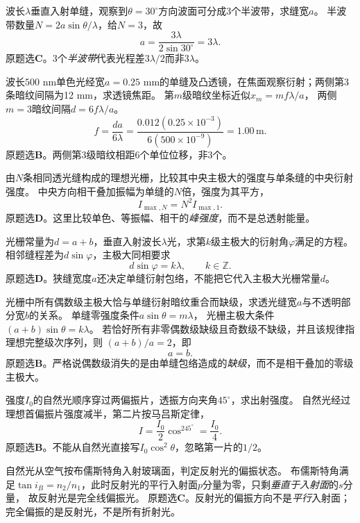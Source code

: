\problemtext 波长$\lambda$垂直入射单缝，观察到$\theta=30^\circ$方向波面可分成3个半波带，求缝宽$a$。
\workings
半波带数量$N=2a\sin\theta/\lambda$，给$N=3$，故
\[
\boxed{a=\frac{3\lambda}{2\sin30^\circ}=3\lambda}.
\]
原题选\textbf{C}。\crosscheck 3个\emph{半波带}代表光程差$3\lambda/2$而非$3\lambda$。

\problemtext 波长$500$ nm单色光经宽$a=0.25$ mm的单缝及凸透镜，在焦面观察衍射；两侧第3条暗纹间隔为12 mm，求透镜焦距。
\workings
第$m$级暗纹坐标近似$x_m=mf\lambda/a$，
两侧$m=3$暗纹间隔$d=6f\lambda/a$。
\[
\boxed{f=\frac{da}{6\lambda}
=\frac{0.012(0.25\times10^{-3})}{6(500\times10^{-9})}
=1.00\,\mathrm m}.
\]
原题选\textbf{B}。\crosscheck 两侧第3级暗纹相距$6$个单位位移，非$3$个。

\problemtext 由$N$条相同透光缝构成的理想光栅，比较其中央主极大的强度与单条缝的中央衍射强度。
\workings
中央方向相干叠加振幅为单缝的$N$倍，强度为其平方，
\[
\boxed{I_{\max,N}=N^2I_{\max,1}}.
\]
原题选\textbf{D}。\crosscheck 这里比较单色、等振幅、相干的\emph{峰强度}，而不是总透射能量。

\problemtext 光栅常量为$d=a+b$，垂直入射波长$\lambda$光，求第$k$级主极大的衍射角$\varphi$满足的方程。
\workings
相邻缝程差为$d\sin\varphi$，主极大同相要求
\[
\boxed{d\sin\varphi=k\lambda},\qquad k\in\mathbb Z.
\]
原题选\textbf{D}。\crosscheck 狭缝宽度$a$还决定单缝衍射包络，不能把它代入主极大光栅常量$d$。

\problemtext 光栅中所有偶数级主极大恰与单缝衍射暗纹重合而缺级，求透光缝宽$a$与不透明部分宽$b$的关系。
\workings
单缝零强度条件$a\sin\theta=m\lambda$，
光栅主极大条件$(a+b)\sin\theta=k\lambda$。
若恰好所有非零偶数级缺级且奇数级不缺级，并且该规律指理想完整级次序列，则
$(a+b)/a=2$，即
\[
\boxed{a=b}.
\]
原题选\textbf{B}。\crosscheck 严格说偶数级消失的是由单缝包络造成的\emph{缺级}，而不是相干叠加的零级主极大。

\problemtext 强度$I_0$的自然光顺序穿过两偏振片，透振方向夹角$45^\circ$，求出射强度。
\workings
自然光经过理想首偏振片强度减半，第二片按马吕斯定律，
\[
\boxed{I=\frac{I_0}{2}\cos^245^\circ=\frac{I_0}{4}}.
\]
原题选\textbf{B}。\crosscheck 不能从自然光直接写$I_0\cos^2\theta$，忽略第一片的$1/2$。

\problemtext 自然光从空气按布儒斯特角入射玻璃面，判定反射光的偏振状态。
\workings
布儒斯特角满足$\tan i_B=n_2/n_1$，此时反射光的平行入射面$p$分量为零，只剩\emph{垂直于入射面}的$s$分量，
故反射光是完全线偏振光。
原题选\textbf{C}。\crosscheck 反射光的偏振方向不是\emph{平行}入射面；完全偏振的是反射光，不是所有折射光。

